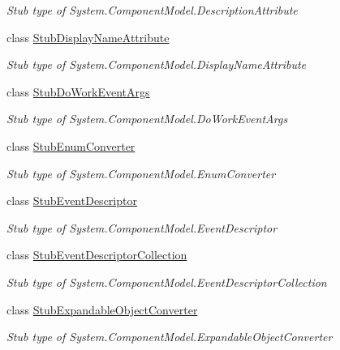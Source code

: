 \begin{DoxyCompactItemize}
\begin{DoxyCompactList}\small\item\em Stub type of System.\-Component\-Model.\-Description\-Attribute\end{DoxyCompactList}\item 
class \hyperlink{class_system_1_1_component_model_1_1_fakes_1_1_stub_display_name_attribute}{Stub\-Display\-Name\-Attribute}
\begin{DoxyCompactList}\small\item\em Stub type of System.\-Component\-Model.\-Display\-Name\-Attribute\end{DoxyCompactList}\item 
class \hyperlink{class_system_1_1_component_model_1_1_fakes_1_1_stub_do_work_event_args}{Stub\-Do\-Work\-Event\-Args}
\begin{DoxyCompactList}\small\item\em Stub type of System.\-Component\-Model.\-Do\-Work\-Event\-Args\end{DoxyCompactList}\item 
class \hyperlink{class_system_1_1_component_model_1_1_fakes_1_1_stub_enum_converter}{Stub\-Enum\-Converter}
\begin{DoxyCompactList}\small\item\em Stub type of System.\-Component\-Model.\-Enum\-Converter\end{DoxyCompactList}\item 
class \hyperlink{class_system_1_1_component_model_1_1_fakes_1_1_stub_event_descriptor}{Stub\-Event\-Descriptor}
\begin{DoxyCompactList}\small\item\em Stub type of System.\-Component\-Model.\-Event\-Descriptor\end{DoxyCompactList}\item 
class \hyperlink{class_system_1_1_component_model_1_1_fakes_1_1_stub_event_descriptor_collection}{Stub\-Event\-Descriptor\-Collection}
\begin{DoxyCompactList}\small\item\em Stub type of System.\-Component\-Model.\-Event\-Descriptor\-Collection\end{DoxyCompactList}\item 
class \hyperlink{class_system_1_1_component_model_1_1_fakes_1_1_stub_expandable_object_converter}{Stub\-Expandable\-Object\-Converter}
\begin{DoxyCompactList}\small\item\em Stub type of System.\-Component\-Model.\-Expandable\-Object\-Converter\end{DoxyCompactList}\item 

\end{DoxyCompactItemize}
